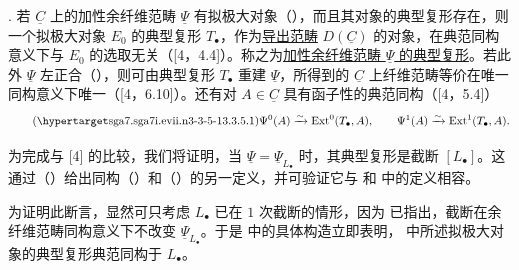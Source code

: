 . 若 $\underline C$ 上的加性余纤维范畴 $\underline\Psi$ 有拟极大对象（），而且其对象的典型复形存在，则一个拟极大对象 $E_0$ 的典型复形 $T_\bullet$，作为\underline{导出范畴} $D(\underline C)$ 的对象，在典范同构意义下与 $E_0$ 的选取无关（[4，4.4]）。称之为\underline{加性余纤维范畴 $\underline\Psi$ 的典型复形}。若此外 $\underline\Psi$ 左正合（），则可由典型复形 $T_\bullet$ 重建 $\underline\Psi$，所得到的 $\underline C$ 上纤维范畴等价在唯一同构意义下唯一（[4，6.10]）。还有对 $A\in\underline C$ 具有函子性的典范同构（[4，5.4]）
\begin{equation}\tag{\SGARefTarget{sga7.sga7i.evii.n3-3-5-1}{3.3.5.1}}
 \Psi^0(A)\xrightarrow{\sim}\Ext^0(T_\bullet,A),
 \qquad
 \Psi^1(A)\xrightarrow{\sim}\Ext^1(T_\bullet,A).
\end{equation}


为完成与 [4] 的比较，我们将证明，当 $\underline\Psi=\underline\Psi_{L_\bullet}$ 时，其典型复形是截断 $[L_\bullet]$。这通过（）给出同构（）和（）的另一定义，并可验证它与  和  中的定义相容。

为证明此断言，显然可只考虑 $L_\bullet$ 已在 $1$ 次截断的情形，因为  已指出，截断在余纤维范畴同构意义下不改变 $\underline\Psi_{L_\bullet}$。于是  中的具体构造立即表明， 中所述拟极大对象的典型复形典范同构于 $L_\bullet$。

